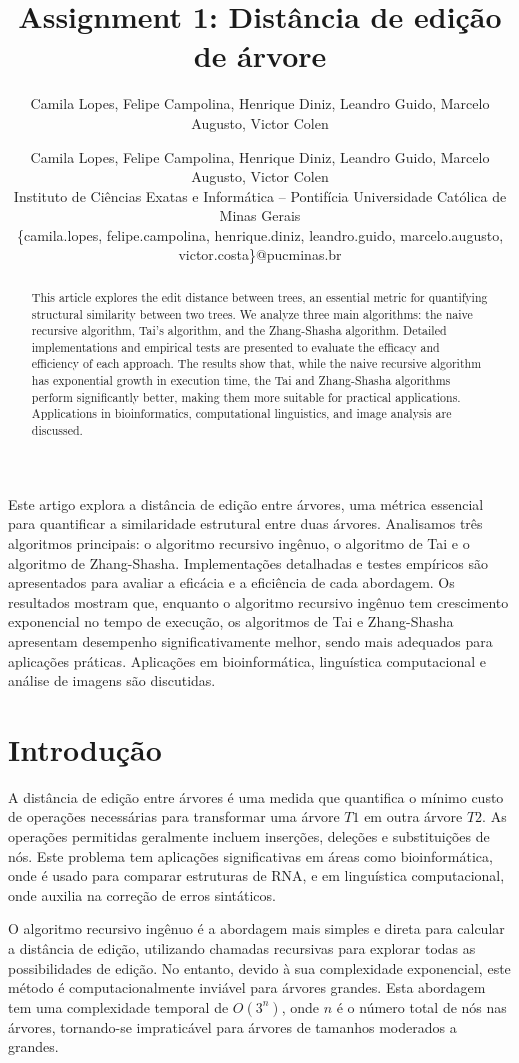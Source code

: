 \documentclass[12pt]{article}
\title{Assignment 1: Distância de edição de árvore}
\author{Camila Lopes, Felipe Campolina, Henrique Diniz, Leandro Guido, Marcelo Augusto, Victor Colen\inst{1}}
\author{
Camila Lopes, Felipe Campolina, Henrique Diniz, Leandro Guido, Marcelo Augusto, Victor Colen \\
Instituto de Ciências Exatas e Informática -- Pontifícia Universidade Católica de Minas Gerais \\
\{camila.lopes, felipe.campolina, henrique.diniz, leandro.guido, marcelo.augusto, victor.costa\}@pucminas.br
}
\begin{document}
\maketitle

\begin{abstract}
This article explores the edit distance between trees, an essential metric for quantifying structural similarity between two trees. We analyze three main algorithms: the naive recursive algorithm, Tai's algorithm, and the Zhang-Shasha algorithm. Detailed implementations and empirical tests are presented to evaluate the efficacy and efficiency of each approach. The results show that, while the naive recursive algorithm has exponential growth in execution time, the Tai and Zhang-Shasha algorithms perform significantly better, making them more suitable for practical applications. Applications in bioinformatics, computational linguistics, and image analysis are discussed.
\end{abstract}

\begin{resumo}
Este artigo explora a distância de edição entre árvores, uma métrica essencial para quantificar a similaridade estrutural entre duas árvores. Analisamos três algoritmos principais: o algoritmo recursivo ingênuo, o algoritmo de Tai e o algoritmo de Zhang-Shasha. Implementações detalhadas e testes empíricos são apresentados para avaliar a eficácia e a eficiência de cada abordagem. Os resultados mostram que, enquanto o algoritmo recursivo ingênuo tem crescimento exponencial no tempo de execução, os algoritmos de Tai e Zhang-Shasha apresentam desempenho significativamente melhor, sendo mais adequados para aplicações práticas. Aplicações em bioinformática, linguística computacional e análise de imagens são discutidas.
\end{resumo}

     
\section{Introdução}
A distância de edição entre árvores é uma medida que quantifica o mínimo custo de operações necessárias para transformar uma árvore \( T1 \) em outra árvore \( T2 \). As operações permitidas geralmente incluem inserções, deleções e substituições de nós. Este problema tem aplicações significativas em áreas como bioinformática, onde é usado para comparar estruturas de RNA, e em linguística computacional, onde auxilia na correção de erros sintáticos.

O algoritmo recursivo ingênuo é a abordagem mais simples e direta para calcular a distância de edição, utilizando chamadas recursivas para explorar todas as possibilidades de edição. No entanto, devido à sua complexidade exponencial, este método é computacionalmente inviável para árvores grandes. Esta abordagem tem uma complexidade temporal de \( O(3^n) \), onde \( n \) é o número total de nós nas árvores, tornando-se impraticável para árvores de tamanhos moderados a grandes.
\end{document}
